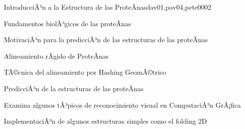 \begin{syllabus}
\begin{unit}{IntroducciÃ³n a la Estructura de las ProteÃ­nas}{dav01,pav04,pete00}{0}{2}
\begin{topics}
        \item Fundamentos biolÃ³gicos de las proteÃ­nas
        \item MotivaciÃ³n para la predicciÃ³n de las estructuras de las proteÃ­nas
        \item Alineamiento rÃ­gido de ProteÃ­nas
        \item TÃ©cnica del alineamiento por Hashing GeomÃ©trico
        \item PredicciÃ³n de la estructuras de las proteÃ­nas
    \end{topics}

    \begin{learningoutcomes}
        \item Examina algunos tÃ³picos de reconocimiento visual en ComputaciÃ³n GrÃ¡fica
        \item ImplementaciÃ³n de algunos estructuras simples como el folding 2D
    \end{learningoutcomes}
\end{unit}



\begin{coursebibliography}
\end{coursebibliography}

\end{syllabus}
